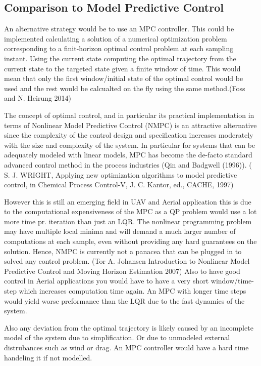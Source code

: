 \subsection{Comparison to Model Predictive Control}\label{sec:prob33}

An alternative strategy would be to use an MPC controller. This could be implemented calculating a solution of a numerical optimization problem corresponding to a finit-horizon optimal control problem at each sampling instant. Using the current state computing the optimal trajectory from the current state to the targeted state given a finite window of time. This would mean that only the first window/initial state of the optimal control would be used and the rest would be calcualted on the fly using the same method.(Foss and N. Heirung 2014)

The concept of optimal control, and in particular its practical implementation in terms of Nonlinear Model Predictive Control (NMPC) is an attractive alternative since the complexity of the control design and specification increases moderately with the size and complexity of the system. In particular for systems that can be adequately modeled with linear models, MPC has become the de-facto standard advanced control method in the process industries (Qin and Badgwell (1996)).
( S. J. WRIGHT, Applying new optimization algorithms to model predictive control, in Chemical Process Control-V, J. C. Kantor, ed., CACHE, 1997)

However this is still an emerging field in UAV and Aerial application this is due to the computational expensiveness of the MPC as a QP problem would use a lot more time pr. iteration than just an LQR. The nonlinear programming problem may have multiple local minima and will demand a much larger number of computations at each sample, even without providing any hard guarantees on the solution. Hence, NMPC is currently not a panacea that can be plugged in to solved any control problem. (Tor A. Johansen Introduction to Nonlinear Model Predictive Control and Moving Horizon Estimation 2007) Also to have good control in Aerial applications you would have to have a very short window/time-step which increases computation time again. An MPC with longer time steps would yield worse preformance than the LQR due to the fast dynamics of the system.

Also any deviation from the optimal trajectory is likely caused by an incomplete model of the system due to simplification. Or due to unmodeled external distrubances such as wind or drag. An MPC controller would have a hard time handeling it if not modelled.


